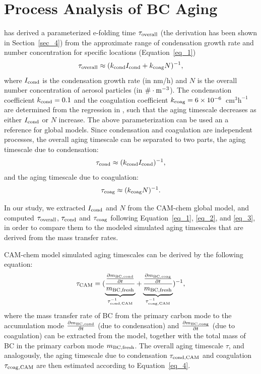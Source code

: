 \documentclass[12pt, fullpage]{uiucthesis2009_2}
\begin{document}
	\section{Process Analysis of BC Aging}
	\citet{Fierce2016} has derived a parameterized e-folding time $\tau_{\rm overall}$ (the derivation has been shown in Section~\ref{sec_4}) from the approximate range of condensation growth rate and number concentration for specific locations (Equation~\ref{eq_1}) 
	\begin{align}{\label{eq_1}}
	\tau_{\rm overall} \approx (k_{\rm cond}I_{\rm cond} + k_{\rm coag}N)^{-1},
	\end{align} 
	where $I_{\rm cond}$ is the condensation growth rate (in nm/h) and $N$ is the overall number concentration of aerosol particles (in $ \# \cdot \rm m^{-3}$). The condensation coefficient $k_{\rm cond} = 0.1$ and the coagulation coefficient $k_{\rm coag} = 6\times 10^{-6}$~$\text{cm}^3\text{h}^{-1}$ are determined from the regression in \citet{Fierce2016}, such that the aging timescale decreases as either $I_{\rm cond}$ or $N$ increase. The above parameterization can be used an a reference for global models. Since condensation and coagulation are independent processes, the overall aging timescale can be separated to two parts, the aging timescale due to condensation:
	\begin{align}{\label{eq_2}}
	\tau_{\rm cond} \approx (k_{\rm cond}I_{\rm cond})^{-1},
	\end{align} 
	and the aging timescale due to coagulation:
	\begin{align}{\label{eq_3}}
	\tau_{\rm coag} \approx (k_{\rm coag}N)^{-1}.
	\end{align}  
	
    In our study, we extracted $I_{\rm cond}$ and $N$ from the CAM-chem global model, and computed $\tau_{\rm overall}$, $\tau_{\rm cond}$ and $\tau_{\rm coag}$ following Equation~\ref{eq_1}, \ref{eq_2}, and \ref{eq_3}, in order to compare them to the modeled simulated aging timescales that are derived from the mass transfer rates.
	
	CAM-chem model simulated aging timescales can be derived by the following equation:
	\begin{align}{\label{eq_4}}
	\tau_{\rm CAM} = (\underbrace{\frac{\frac{\partial m_{\rm BC, cond}}{\partial t}}{m_{\rm BC, fresh}}}_{\tau_{\rm cond, CAM}^{-1}} + \underbrace{\frac{\frac{\partial m_{\rm BC, coag}}{\partial t}}{m_{\rm BC, fresh}}}_{\tau_{\rm coag, CAM}^{-1}})^{-1},
	\end{align} 
	where the mass transfer rate of BC from the primary carbon mode to the accumulation mode $\frac{\partial m_{\rm BC, cond}}{\partial t}$ (due to condensation) and $\frac{\partial m_{\rm BC, coag}}{\partial t}$ (due to coagulation) can be extracted from the model, together with the total mass of BC in the primary carbon mode $m_{\rm BC, fresh}$. The overall aging timescale $\tau$, and analogously, the aging timescale due to condensation $\tau_{\rm cond, CAM}$ and coagulation $\tau_{\rm coag, CAM}$ are then estimated according to Equation~\ref{eq_4}.
	
\end{document}

